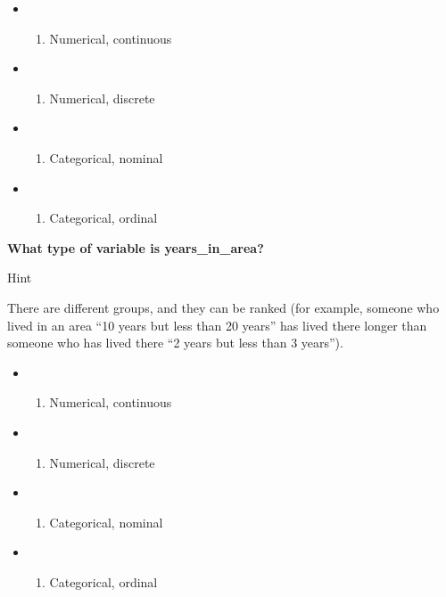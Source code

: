 \documentclass[
]{book}
\providecommand{\tightlist}{%
  \setlength{\itemsep}{0pt}\setlength{\parskip}{0pt}}
\begin{document}
\begin{itemize}
\item
  \begin{enumerate}
  \def\labelenumi{(\Alph{enumi})}
  \tightlist
  \item
    Numerical, continuous\\
  \end{enumerate}
\item
  \begin{enumerate}
  \def\labelenumi{(\Alph{enumi})}
  \setcounter{enumi}{1}
  \tightlist
  \item
    Numerical, discrete\\
  \end{enumerate}
\item
  \begin{enumerate}
  \def\labelenumi{(\Alph{enumi})}
  \setcounter{enumi}{2}
  \tightlist
  \item
    Categorical, nominal\\
  \end{enumerate}
\item
  \begin{enumerate}
  \def\labelenumi{(\Alph{enumi})}
  \setcounter{enumi}{3}
  \tightlist
  \item
    Categorical, ordinal
  \end{enumerate}
\end{itemize}

\textbf{What type of variable is years\_in\_area?}

Hint

There are different groups, and they can be ranked (for example, someone who lived in an area ``10 years but less than 20 years'' has lived there longer than someone who has lived there ``2 years but less than 3 years'').

\begin{itemize}
\item
  \begin{enumerate}
  \def\labelenumi{(\Alph{enumi})}
  \tightlist
  \item
    Numerical, continuous\\
  \end{enumerate}
\item
  \begin{enumerate}
  \def\labelenumi{(\Alph{enumi})}
  \setcounter{enumi}{1}
  \tightlist
  \item
    Numerical, discrete\\
  \end{enumerate}
\item
  \begin{enumerate}
  \def\labelenumi{(\Alph{enumi})}
  \setcounter{enumi}{2}
  \tightlist
  \item
    Categorical, nominal\\
  \end{enumerate}
\item
  \begin{enumerate}
  \def\labelenumi{(\Alph{enumi})}
  \setcounter{enumi}{3}
  \tightlist
  \item
    Categorical, ordinal
  \end{enumerate}
\end{itemize}
\end{document}
